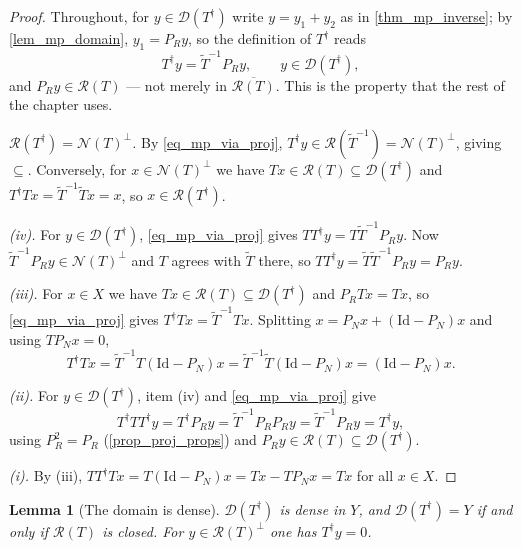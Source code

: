 \documentclass[a4paper]{report}
\theoremstyle{plain}
\newtheorem{lemma}[theorem]{Lemma}
\theoremstyle{definition}
\theoremstyle{remark}
\newcommand{\Ran}{\mathcal{R}}
\newcommand{\Ker}{\mathcal{N}}
\newcommand{\Dom}{\mathcal{D}}
\newcommand{\Id}{\mathrm{Id}}
\newcommand{\dg}{^{\dagger}}
\begin{document}
\begin{proof}
  Throughout, for $y \in \Dom(T\dg)$ write $y = y_1 + y_2$ as in \cref{thm_mp_inverse};
  by \cref{lem_mp_domain}, $y_1 = P_Ry$, so the definition of $T\dg$ reads
  \begin{equation}\label{eq_mp_via_proj}
    T\dg y = \tilde{T}^{-1}P_Ry, \qquad y \in \Dom(T\dg),
  \end{equation}
  and $P_Ry \in \Ran(T)$ --- not merely in $\overline{\Ran(T)}$.  This is the property
  that the rest of the chapter uses.

  \emph{$\Ran(T\dg) = \Ker(T)^{\perp}$.}  By \eqref{eq_mp_via_proj},
  $T\dg y \in \Ran(\tilde{T}^{-1}) = \Ker(T)^{\perp}$, giving $\subseteq$.  Conversely, for
  $x \in \Ker(T)^{\perp}$ we have $Tx \in \Ran(T) \subseteq \Dom(T\dg)$ and
  $T\dg Tx = \tilde{T}^{-1}\tilde{T}x = x$, so $x \in \Ran(T\dg)$.

  \emph{(iv).}  For $y \in \Dom(T\dg)$, \eqref{eq_mp_via_proj} gives
  $TT\dg y = T\tilde{T}^{-1}P_Ry$.  Now $\tilde{T}^{-1}P_Ry \in \Ker(T)^{\perp}$ and $T$
  agrees with $\tilde{T}$ there, so
  $TT\dg y = \tilde{T}\tilde{T}^{-1}P_Ry = P_Ry$.

  \emph{(iii).}  For $x \in X$ we have $Tx \in \Ran(T) \subseteq \Dom(T\dg)$ and
  $P_RTx = Tx$, so \eqref{eq_mp_via_proj} gives $T\dg Tx = \tilde{T}^{-1}Tx$.  Splitting
  $x = P_Nx + (\Id - P_N)x$ and using $TP_Nx = 0$,
  \[
    T\dg Tx = \tilde{T}^{-1}T(\Id - P_N)x = \tilde{T}^{-1}\tilde{T}(\Id - P_N)x
      = (\Id - P_N)x .
  \]

  \emph{(ii).}  For $y \in \Dom(T\dg)$, item (iv) and \eqref{eq_mp_via_proj} give
  \[
    T\dg TT\dg y = T\dg P_Ry = \tilde{T}^{-1}P_R P_R y = \tilde{T}^{-1}P_Ry = T\dg y,
  \]
  using $P_R^2 = P_R$ (\cref{prop_proj_props}) and
  $P_Ry \in \Ran(T) \subseteq \Dom(T\dg)$.

  \emph{(i).}  By (iii), $TT\dg Tx = T(\Id - P_N)x = Tx - TP_Nx = Tx$ for all $x \in X$.
\end{proof}


\begin{lemma}[The domain is dense]
  \label{lem_mp_domain_dense}
  $\Dom(T\dg)$ is dense in $Y$, and $\Dom(T\dg) = Y$ if and only if $\Ran(T)$ is closed.
  For $y \in \Ran(T)^{\perp}$ one has $T\dg y = 0$.
\end{lemma}
\end{document}
